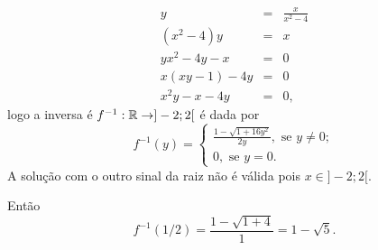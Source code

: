 \begin{eqnarray*}
	y & = & \frac{x}{x^2-4}\\
	(x^2-4)y & = & x\\
	yx^2-4y-x & = & 0 \\
	x(xy-1)-4y & = & 0\\
	x^2y-x-4y & = & 0,
\end{eqnarray*}
logo a inversa é $f^{-1}:\mathbb{R}\rightarrow]-2;2[$ é dada por
\[
	f^{-1}(y)=\left\{\begin{array}{l}
			\frac{1-\sqrt{1+16y^2}}{2y},\mbox{ se }y\not=0;\\
			0,\mbox{ se }y=0.\end{array}\right.
\]
A solução com o outro sinal da raiz não é válida pois $x\in]-2;2[$.

Então
\[
	f^{-1}(1/2)=\frac{1-\sqrt{1+4}}{1}=1-\sqrt{5}.
\]
